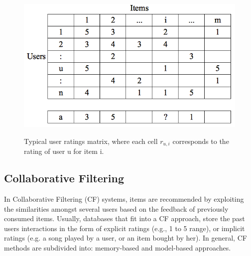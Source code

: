 \begin{figure}[h]
\centering
\caption[Typical user rating matrix]{Typical user ratings matrix, where each cell $r_{u,i}$ corresponds to the rating of user u for item i.}
\includegraphics[scale=0.9]{images/uimatrix}
\label{fig:iomatrix}
\end{figure}

\subsection{Collaborative Filtering} 

In Collaborative Filtering (CF) systems, items are recommended by exploiting the similarities amongst several users based on the feedback of previously consumed items. Usually, databases that fit into a CF approach, store the past users interactions in the form of explicit ratings (e.g., 1 to 5 range), or implicit ratings (e.g. a song played by a user, or an item bought by her). In general, CF methods are subdivided into: memory-based and model-based approaches.

